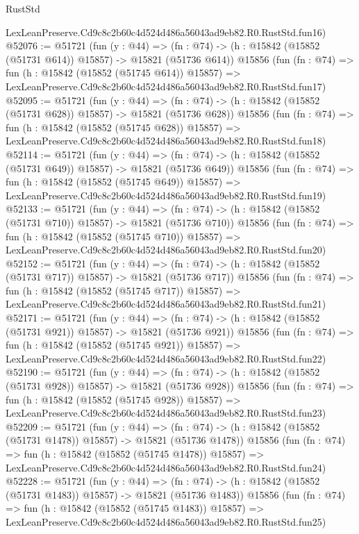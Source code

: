 \begin{lexlean}{RustStd}
\begin{coremodule}
    LexLeanPreserve.Cd9c8c2b60c4d524d486a56043ad9eb82.R0.RustStd.fun16)
@52076 := @51721
    (fun (y : @44) =>
    (fn : @74) -> (h : @15842 (@15852 (@51731 @614)) @15857) -> @15821 (@51736 @614))
    @15856
    (fun (fn : @74) =>
    fun (h : @15842 (@15852 (@51745 @614)) @15857) =>
    LexLeanPreserve.Cd9c8c2b60c4d524d486a56043ad9eb82.R0.RustStd.fun17)
@52095 := @51721
    (fun (y : @44) =>
    (fn : @74) -> (h : @15842 (@15852 (@51731 @628)) @15857) -> @15821 (@51736 @628))
    @15856
    (fun (fn : @74) =>
    fun (h : @15842 (@15852 (@51745 @628)) @15857) =>
    LexLeanPreserve.Cd9c8c2b60c4d524d486a56043ad9eb82.R0.RustStd.fun18)
@52114 := @51721
    (fun (y : @44) =>
    (fn : @74) -> (h : @15842 (@15852 (@51731 @649)) @15857) -> @15821 (@51736 @649))
    @15856
    (fun (fn : @74) =>
    fun (h : @15842 (@15852 (@51745 @649)) @15857) =>
    LexLeanPreserve.Cd9c8c2b60c4d524d486a56043ad9eb82.R0.RustStd.fun19)
@52133 := @51721
    (fun (y : @44) =>
    (fn : @74) -> (h : @15842 (@15852 (@51731 @710)) @15857) -> @15821 (@51736 @710))
    @15856
    (fun (fn : @74) =>
    fun (h : @15842 (@15852 (@51745 @710)) @15857) =>
    LexLeanPreserve.Cd9c8c2b60c4d524d486a56043ad9eb82.R0.RustStd.fun20)
@52152 := @51721
    (fun (y : @44) =>
    (fn : @74) -> (h : @15842 (@15852 (@51731 @717)) @15857) -> @15821 (@51736 @717))
    @15856
    (fun (fn : @74) =>
    fun (h : @15842 (@15852 (@51745 @717)) @15857) =>
    LexLeanPreserve.Cd9c8c2b60c4d524d486a56043ad9eb82.R0.RustStd.fun21)
@52171 := @51721
    (fun (y : @44) =>
    (fn : @74) -> (h : @15842 (@15852 (@51731 @921)) @15857) -> @15821 (@51736 @921))
    @15856
    (fun (fn : @74) =>
    fun (h : @15842 (@15852 (@51745 @921)) @15857) =>
    LexLeanPreserve.Cd9c8c2b60c4d524d486a56043ad9eb82.R0.RustStd.fun22)
@52190 := @51721
    (fun (y : @44) =>
    (fn : @74) -> (h : @15842 (@15852 (@51731 @928)) @15857) -> @15821 (@51736 @928))
    @15856
    (fun (fn : @74) =>
    fun (h : @15842 (@15852 (@51745 @928)) @15857) =>
    LexLeanPreserve.Cd9c8c2b60c4d524d486a56043ad9eb82.R0.RustStd.fun23)
@52209 := @51721
    (fun (y : @44) =>
    (fn : @74) -> (h : @15842 (@15852 (@51731 @1478)) @15857) -> @15821 (@51736 @1478))
    @15856
    (fun (fn : @74) =>
    fun (h : @15842 (@15852 (@51745 @1478)) @15857) =>
    LexLeanPreserve.Cd9c8c2b60c4d524d486a56043ad9eb82.R0.RustStd.fun24)
@52228 := @51721
    (fun (y : @44) =>
    (fn : @74) -> (h : @15842 (@15852 (@51731 @1483)) @15857) -> @15821 (@51736 @1483))
    @15856
    (fun (fn : @74) =>
    fun (h : @15842 (@15852 (@51745 @1483)) @15857) =>
    LexLeanPreserve.Cd9c8c2b60c4d524d486a56043ad9eb82.R0.RustStd.fun25)

\end{coremodule}
\end{lexlean}
